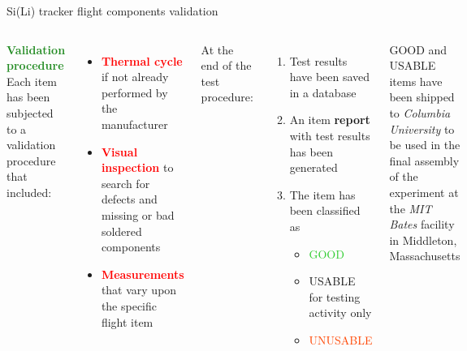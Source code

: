 \documentclass[aspectratio=169,xcolor=dvipsnames,handout]{beamer} %
\begin{document}
\begin{frame}{Si(Li) tracker flight components validation}
    \fontsize{8.5pt}{1}\selectfont
    \begin{columns}
        \textbf{\large \textcolor{ForestGreen}{Validation procedure}}\\
        \vspace{0.15cm}
        Each item has been subjected to a validation procedure that included:
        \begin{itemize}
            \item \textbf{\textcolor{Red}{Thermal cycle}} if not already performed by the manufacturer
            \item \textbf{\textcolor{Red}{Visual inspection}} to search for defects and missing or bad soldered components
            \item \textbf{\textcolor{Red}{Measurements}} that vary upon the specific flight item
        \end{itemize}
        \vspace{0.2cm}
        At the end of the test procedure:
        \begin{enumerate}
            \item Test results have been saved in a database
            \item An item \textbf{report} with test results has been generated \vspace{-0.18cm}
            \item The item has been classified as
            \begin{itemize}
                \item \textcolor{LimeGreen}{GOOD}
                \item \textcolor{BurntOrange}{USABLE for testing activity only}
                \item \textcolor{OrangeRed}{UNUSABLE}
            \end{itemize}
        \end{enumerate}
        \vspace{0.2cm}
        GOOD and USABLE items have been shipped to \textit{Columbia University} to be used in the final assembly of the experiment at the \textit{MIT Bates} facility in Middleton, Massachusetts
            \centering
            \vskip0.05cm

\end{columns}
\end{frame}
\end{document}
